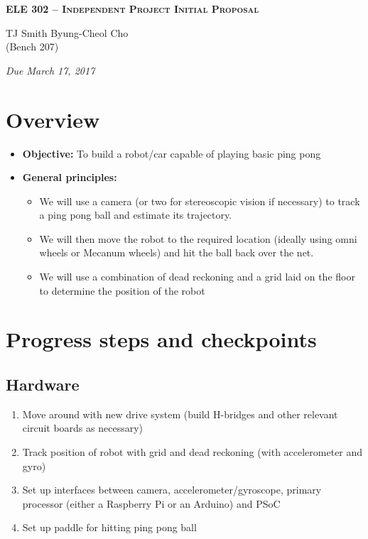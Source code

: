 \documentclass[letterpaper, 11pt]{article}
\begin{document}
    \begin{center}
        \large
        \textsc{\textbf{ELE 302 -- Independent Project Initial Proposal}} \vspace{5pt}

        \normalsize
        TJ Smith \hspace{1cm} Byung-Cheol Cho \\
        (Bench 207) \vspace{5pt}

        \emph{Due March 17, 2017}
        \normalsize
    \end{center}

\section{Overview}
\begin{itemize}
    \item \textbf{Objective:} To build a robot/car capable of playing basic ping pong
    \item \textbf{General principles:}
        \begin{itemize}
            \item We will use a camera (or two for stereoscopic vision if necessary) to track a ping pong ball and estimate its trajectory.
            \item We will then move the robot to the required location (ideally using omni wheels or Mecanum wheels) and hit the ball back over the net.
            \item We will use a combination of dead reckoning and a grid laid on the floor to determine the position of the robot
        \end{itemize}
\end{itemize}

\section{Progress steps and checkpoints}
\subsection*{Hardware}
\begin{enumerate}[label=\textbf{(\arabic*)}]
    \item Move around with new drive system (build H-bridges and other relevant circuit boards as necessary)
    \item Track position of robot with grid and dead reckoning (with accelerometer and gyro)
    \item Set up interfaces between camera, accelerometer/gyroscope, primary processor (either a Raspberry Pi or an Arduino) and PSoC
    \item Set up paddle for hitting ping pong ball
\end{enumerate}
\end{document}
